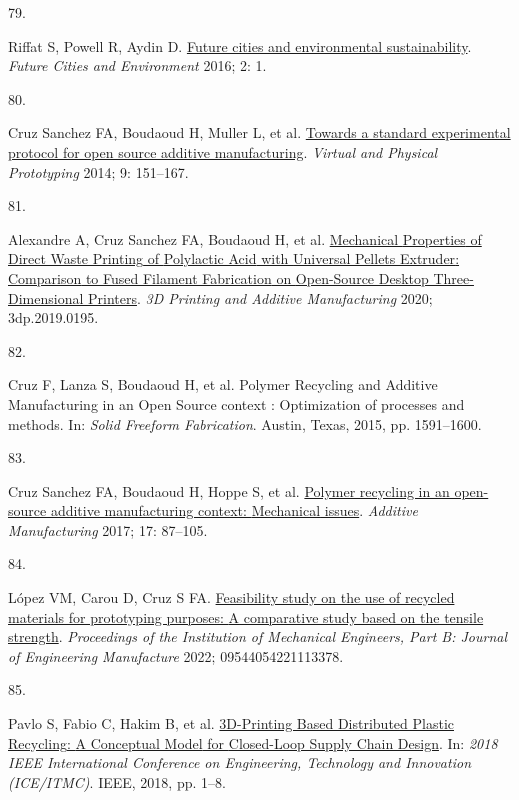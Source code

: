 \documentclass[
  12pt,
  a4paperpaper,
  onecolumn]{article}
\newlength{\cslhangindent}
\newlength{\csllabelwidth}
\newlength{\cslentryspacingunit} %
\newenvironment{CSLReferences}[2] %
 {%
  \setlength{\parindent}{0pt}
  \ifodd #1
  \let\oldpar\par
  \def\par{\hangindent=\cslhangindent\oldpar}
  \fi
  \setlength{\parskip}{#2\cslentryspacingunit}
 }%
 {}
\newcommand{\CSLLeftMargin}[1]{\parbox[t]{\csllabelwidth}{#1}}
\newcommand{\CSLRightInline}[1]{\parbox[t]{\linewidth - \csllabelwidth}{#1}\break}
\begin{document}
\begin{CSLReferences}{0}{0}
\leavevmode{}%
\CSLLeftMargin{79. }%
\CSLRightInline{Riffat S, Powell R, Aydin D.
\href{https://doi.org/10.1186/s40984-016-0014-2}{Future cities and
environmental sustainability}. \emph{Future Cities and Environment}
2016; 2: 1.}

\leavevmode{}%
\CSLLeftMargin{80. }%
\CSLRightInline{Cruz Sanchez FA, Boudaoud H, Muller L, et al.
\href{https://doi.org/10.1080/17452759.2014.919553}{Towards a standard
experimental protocol for open source additive manufacturing}.
\emph{Virtual and Physical Prototyping} 2014; 9: 151--167.}

\leavevmode{}%
\CSLLeftMargin{81. }%
\CSLRightInline{Alexandre A, Cruz Sanchez FA, Boudaoud H, et al.
\href{https://doi.org/10.1089/3dp.2019.0195}{Mechanical {Properties} of
{Direct Waste Printing} of {Polylactic Acid} with {Universal Pellets
Extruder}: {Comparison} to {Fused Filament Fabrication} on {Open-Source
Desktop Three-Dimensional Printers}}. \emph{3D Printing and Additive
Manufacturing} 2020; 3dp.2019.0195.}

\leavevmode{}%
\CSLLeftMargin{82. }%
\CSLRightInline{Cruz F, Lanza S, Boudaoud H, et al. Polymer {Recycling}
and {Additive Manufacturing} in an {Open Source} context :
{Optimization} of processes and methods. In: \emph{Solid {Freeform
Fabrication}}. {Austin, Texas}, 2015, pp. 1591--1600.}

\leavevmode{}%
\CSLLeftMargin{83. }%
\CSLRightInline{Cruz Sanchez FA, Boudaoud H, Hoppe S, et al.
\href{https://doi.org/10.1016/j.addma.2017.05.013}{Polymer recycling in
an open-source additive manufacturing context: {Mechanical} issues}.
\emph{Additive Manufacturing} 2017; 17: 87--105.}

\leavevmode{}%
\CSLLeftMargin{84. }%
\CSLRightInline{López VM, Carou D, Cruz S FA.
\href{https://doi.org/10.1177/09544054221113378}{Feasibility study on
the use of recycled materials for prototyping purposes: {A} comparative
study based on the tensile strength}. \emph{Proceedings of the
Institution of Mechanical Engineers, Part B: Journal of Engineering
Manufacture} 2022; 09544054221113378.}

\leavevmode{}%
\CSLLeftMargin{85. }%
\CSLRightInline{Pavlo S, Fabio C, Hakim B, et al.
\href{https://doi.org/10.1109/ICE.2018.8436296}{{3D-Printing Based
Distributed Plastic Recycling}: {A Conceptual Model} for {Closed-Loop
Supply Chain Design}}. In: \emph{2018 {IEEE International Conference} on
{Engineering}, {Technology} and {Innovation} ({ICE}/{ITMC})}. {IEEE},
2018, pp. 1--8.}


\end{CSLReferences}
\end{document}
